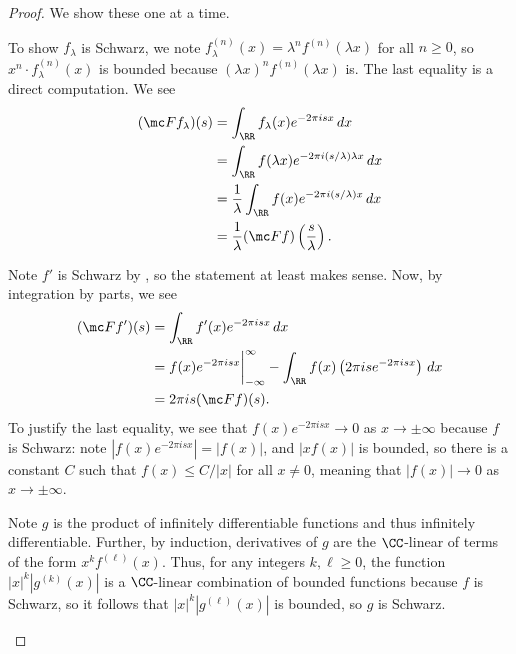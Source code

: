 \documentclass[notes.tex]{subfiles}
\begin{document}
\begin{proof}
	We show these one at a time.
	\begin{listalph}
		\item To show $f_\lambda$ is Schwarz, we note $f^{(n)}_\lambda(x)=\lambda^nf^{(n)}(\lambda x)$ for all $n\ge0$, so $x^n\cdot f^{(n)}_\lambda(x)$ is bounded because $(\lambda x)^nf^{(n)}(\lambda x)$ is. The last equality is a direct computation. We see
		\begin{align*}
			(\mc Ff_\lambda)(s) &= \int_\RR f_\lambda(x)e^{-2\pi isx}\,dx \\
			&= \int_\RR f(\lambda x)e^{-2\pi i(s/\lambda)\lambda x}\,dx \\
			&= \frac1\lambda\int_\RR f(x)e^{-2\pi i(s/\lambda)x}\,dx \\
			&= \frac1\lambda(\mc Ff)\left(\frac s\lambda\right).
		\end{align*}

		\item Note $f'$ is Schwarz by , so the statement at least makes sense. Now, by integration by parts, we see
		\begin{align*}
			(\mc Ff')(s) &= \int_\RR f'(x)e^{-2\pi isx}\,dx \\
			&= f(x)e^{-2\pi isx}\bigg|_{-\infty}^{\infty}-\int_\RR f(x)\left(2\pi ise^{-2\pi isx}\right)\,dx \\
			&= 2\pi is(\mc Ff)(s).
		\end{align*}
		To justify the last equality, we see that $f(x)e^{-2\pi isx}\to0$ as $x\to\pm\infty$ because $f$ is Schwarz: note $\left|f(x)e^{-2\pi isx}\right|=|f(x)|$, and $|x f(x)|$ is bounded, so there is a constant $C$ such that $f(x)\le C/|x|$ for all $x\ne0$, meaning that $|f(x)|\to0$ as $x\to\pm\infty$.

		\item Note $g$ is the product of infinitely differentiable functions and thus infinitely differentiable. Further, by induction, derivatives of $g$ are the $\CC$-linear of terms of the form $x^kf^{(\ell)}(x)$. Thus, for any integers $k,\ell\ge0$, the function $|x|^k\left|g^{(k)}(x)\right|$ is a $\CC$-linear combination of bounded functions because $f$ is Schwarz, so it follows that $|x|^k\left|g^{(\ell)}(x)\right|$ is bounded, so $g$ is Schwarz.
		

\end{listalph}
\end{proof}
\end{document}
